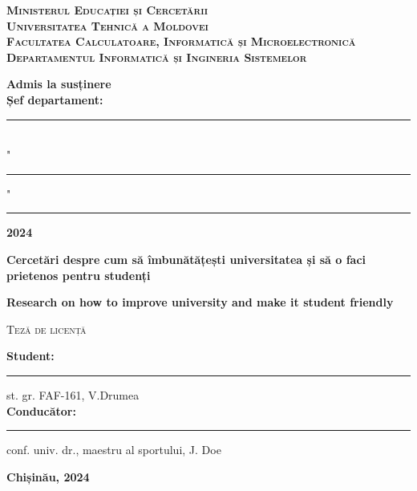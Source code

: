 \begin{titlepage}
	
	\begin{center}
		\large{\textsc{\textbf{Ministerul Educației și Cercetării \\
			                   Universitatea Tehnică a Moldovei \\
		                       Facultatea Calculatoare, Informatică și Microelectronică \\
	                           Departamentul Informatică și Ingineria Sistemelor}}}
		\vspace{1.5cm}
	\end{center}
	
	
	\hfill
	\begin{minipage}{0.4\textwidth}
		\raggedright
		\textbf{Admis la susținere} \\
		\textbf{Șef departament:} \\
		\rule{5.5cm}{0.05cm} \\
		"\rule{1cm}{0.05cm}"\rule{3cm}{0.05cm} \textbf{2024}
	\end{minipage}
	\vspace{2cm}	
	
	
	\begin{center}
		\LARGE{\textbf{Cercetări despre cum să îmbunătățești universitatea și să o faci prietenos pentru studenți}}
		
		\vspace{0.25cm}
		
		\LARGE{\textbf{Research on how to improve university and make it student friendly}}
		
		\vspace{1cm}
		
		\large{\textsc{Teză de licență}}
	\end{center}
	\vspace{1.5cm}
	
	
	\hfill
	\begin{minipage}{0.5\textwidth}
		\raggedright
		\textbf{Student:} \rule{2cm}{0.05cm} st. gr. FAF-161, V.Drumea \\
		\textbf{Conducător:} \rule{2cm}{0.05cm} conf. univ. dr., maestru al sportului, J. Doe \\
	\end{minipage}
	\vspace{2cm}
	
	\vfill
	\begin{center}
		\large{\textbf{Chișinău, 2024}}
	\end{center}

\end{titlepage}